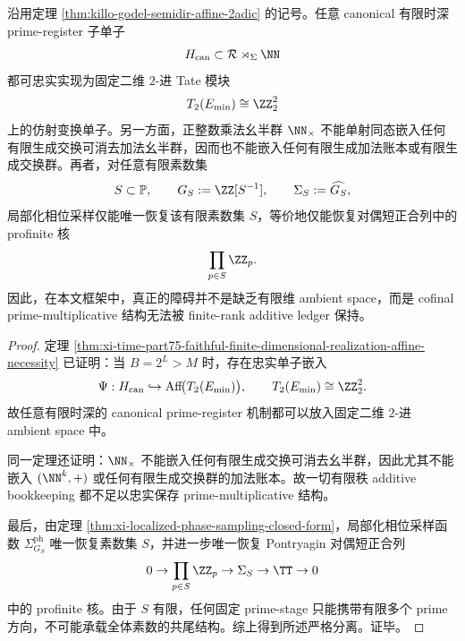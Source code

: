 \begin{theorem}[有限二维全息实现与有限秩账本不可能性的严格分离]\label{thm:xi-time-part9w-twoadic-ambient-vs-additive-ledger-separation}
沿用定理 \ref{thm:killo-godel-semidir-affine-2adic} 的记号。任意 canonical 有限时深 prime-register 子单子
\[
H_{\mathrm{can}}\subset \mathcal R\rtimes_\Sigma \NN
\]
都可忠实实现为固定二维 \(2\)-进 Tate 模块
\[
T_2(E_{\min})\cong \ZZ_2^2
\]
上的仿射变换单子。另一方面，正整数乘法幺半群 \(\NN_{\times}\) 不能单射同态嵌入任何有限生成交换可消去加法幺半群，因而也不能嵌入任何有限生成加法账本或有限生成交换群。再者，对任意有限素数集
\[
S\subset \mathbb P,
\qquad
G_S:=\ZZ[S^{-1}],
\qquad
\Sigma_S:=\widehat{G_S},
\]
局部化相位采样仅能唯一恢复该有限素数集 \(S\)，等价地仅能恢复对偶短正合列中的 profinite 核
\[
\prod_{p\in S}\ZZ_p.
\]
因此，在本文框架中，真正的障碍并不是缺乏有限维 ambient space，而是 cofinal prime-multiplicative 结构无法被 finite-rank additive ledger 保持。
\end{theorem}
\begin{proof}
定理 \ref{thm:xi-time-part75-faithful-finite-dimensional-realization-affine-necessity} 已证明：当 \(B=2^L>M\) 时，存在忠实单子嵌入
\[
\Psi:H_{\mathrm{can}}\hookrightarrow \mathrm{Aff}\!\bigl(T_2(E_{\min})\bigr),
\qquad
T_2(E_{\min})\cong \ZZ_2^2.
\]
故任意有限时深的 canonical prime-register 机制都可以放入固定二维 \(2\)-进 ambient space 中。

同一定理还证明：\(\NN_{\times}\) 不能嵌入任何有限生成交换可消去幺半群，因此尤其不能嵌入 \((\NN^k,+)\) 或任何有限生成交换群的加法账本。故一切有限秩 additive bookkeeping 都不足以忠实保存 prime-multiplicative 结构。

最后，由定理 \ref{thm:xi-localized-phase-sampling-closed-form}，局部化相位采样函数 \(\Sigma^{\mathrm{ph}}_{G_S}\) 唯一恢复素数集 \(S\)，并进一步唯一恢复 Pontryagin 对偶短正合列
\[
0\to \prod_{p\in S}\ZZ_p\to \Sigma_S\to \TT\to 0
\]
中的 profinite 核。由于 \(S\) 有限，任何固定 prime-stage 只能携带有限多个 prime 方向，不可能承载全体素数的共尾结构。综上得到所述严格分离。证毕。
\end{proof}

